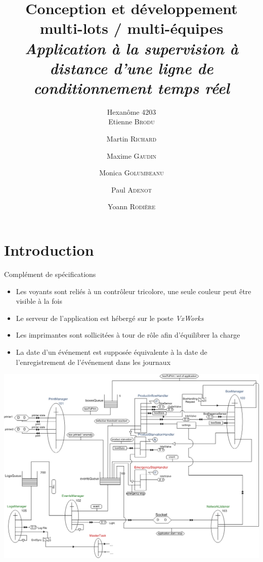 \documentclass{beamer}
\title{Conception et développement multi-lots / multi-équipes\\ \emph{Application à la supervision à distance d'une ligne de conditionnement temps réel}}
\author{Hexanôme 4203\\ Etienne \textsc{Brodu} \and Martin \textsc{Richard} \and Maxime \textsc{Gaudin} \\ \and Monica \textsc{Golumbeanu} \and Paul \textsc{Adenot} \and Yoann \textsc{Rodière}}
\begin{document}
	\begin{frame}
		\titlepage
	\end{frame}

\section{Introduction}
	\begin{frame}
		Complément de spécifications

		\begin{itemize}	
			\item Les voyants sont reliés à un contrôleur tricolore, une seule
couleur peut être visible à la fois
			\item Le serveur de l'application est hébergé sur le poste
\textit{VxWorks}
			\item Les imprimantes sont sollicitées à tour de rôle afin
d'équilibrer la charge
			\item La date d'un événement est supposée équivalente à la date de
l'enregistrement de l'événement dans les journaux
		\end{itemize}
	\end{frame}

	\begin{frame}
		\includegraphics[width=\textwidth]{../../SchemasLCG/schemaGlobal.png}
	\end{frame}
\end{document}

